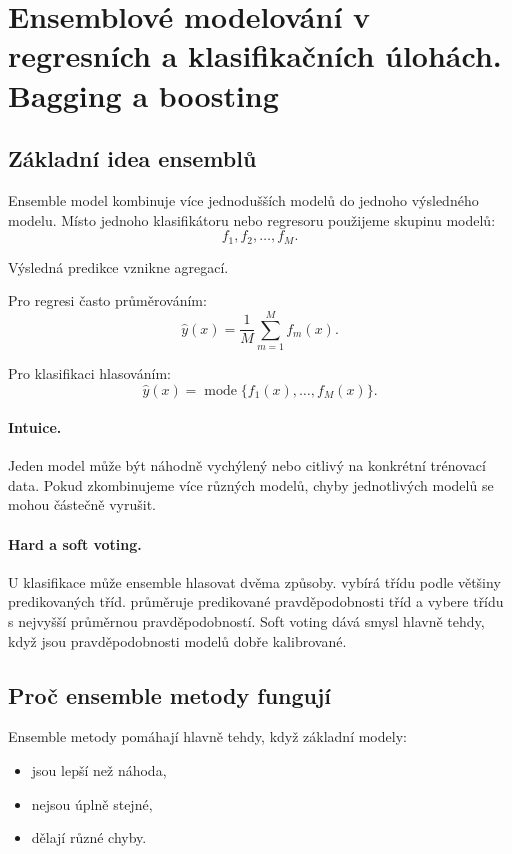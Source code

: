 \section{Ensemblové modelování v regresních a klasifikačních úlohách. Bagging a boosting}

\subsection{Základní idea ensemblů}

Ensemble model kombinuje více jednodušších modelů do jednoho výsledného modelu. Místo jednoho klasifikátoru
nebo regresoru použijeme skupinu modelů:
\[
f_1, f_2, \ldots, f_M.
\]

Výsledná predikce vznikne agregací.

Pro regresi často průměrováním:
\[
\hat{y}(x)
=
\frac{1}{M}
\sum_{m=1}^M
f_m(x).
\]

Pro klasifikaci hlasováním:
\[
\hat{y}(x)
=
\operatorname{mode}
\{f_1(x),\ldots,f_M(x)\}.
\]

\paragraph{Intuice.}
Jeden model může být náhodně vychýlený nebo citlivý na konkrétní trénovací data. Pokud zkombinujeme více
různých modelů, chyby jednotlivých modelů se mohou částečně vyrušit.

\paragraph{Hard a soft voting.}
U klasifikace může ensemble hlasovat dvěma způsoby.  vybírá třídu podle většiny
predikovaných tříd.  průměruje predikované pravděpodobnosti tříd a vybere třídu s nejvyšší
průměrnou pravděpodobností. Soft voting dává smysl hlavně tehdy, když jsou pravděpodobnosti modelů dobře
kalibrované.

\subsection{Proč ensemble metody fungují}

Ensemble metody pomáhají hlavně tehdy, když základní modely:
\begin{itemize}
    \item jsou lepší než náhoda,
    \item nejsou úplně stejné,
    \item dělají různé chyby.
\end{itemize}

